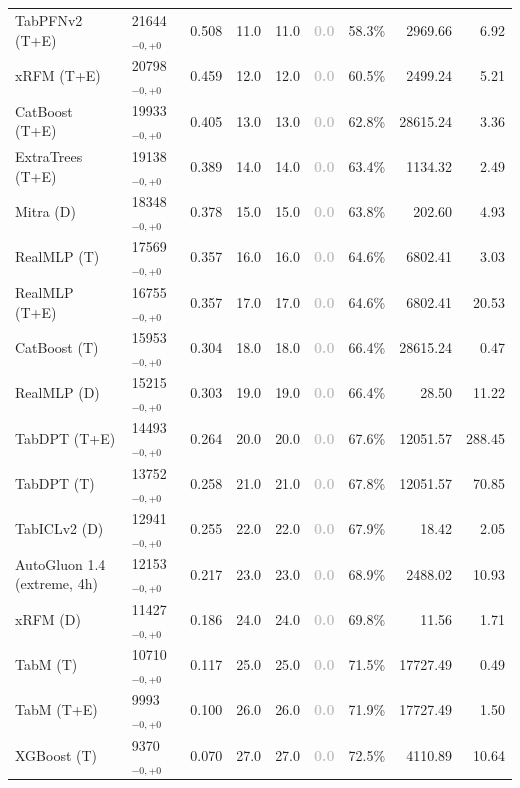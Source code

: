 \begin{tabular}{llcccccrr}
TabPFNv2 (T+E) & 21644${}_{-0,+0}$ & 0.508 & 11.0 & 11.0 & \textcolor{silver}{\textbf{0.0}} & 58.3\% & 2969.66 & 6.92 \\
xRFM (T+E) & 20798${}_{-0,+0}$ & 0.459 & 12.0 & 12.0 & \textcolor{silver}{\textbf{0.0}} & 60.5\% & 2499.24 & 5.21 \\
CatBoost (T+E) & 19933${}_{-0,+0}$ & 0.405 & 13.0 & 13.0 & \textcolor{silver}{\textbf{0.0}} & 62.8\% & 28615.24 & 3.36 \\
ExtraTrees (T+E) & 19138${}_{-0,+0}$ & 0.389 & 14.0 & 14.0 & \textcolor{silver}{\textbf{0.0}} & 63.4\% & 1134.32 & 2.49 \\
Mitra (D) & 18348${}_{-0,+0}$ & 0.378 & 15.0 & 15.0 & \textcolor{silver}{\textbf{0.0}} & 63.8\% & 202.60 & 4.93 \\
RealMLP (T) & 17569${}_{-0,+0}$ & 0.357 & 16.0 & 16.0 & \textcolor{silver}{\textbf{0.0}} & 64.6\% & 6802.41 & 3.03 \\
RealMLP (T+E) & 16755${}_{-0,+0}$ & 0.357 & 17.0 & 17.0 & \textcolor{silver}{\textbf{0.0}} & 64.6\% & 6802.41 & 20.53 \\
CatBoost (T) & 15953${}_{-0,+0}$ & 0.304 & 18.0 & 18.0 & \textcolor{silver}{\textbf{0.0}} & 66.4\% & 28615.24 & 0.47 \\
RealMLP (D) & 15215${}_{-0,+0}$ & 0.303 & 19.0 & 19.0 & \textcolor{silver}{\textbf{0.0}} & 66.4\% & 28.50 & 11.22 \\
TabDPT (T+E) & 14493${}_{-0,+0}$ & 0.264 & 20.0 & 20.0 & \textcolor{silver}{\textbf{0.0}} & 67.6\% & 12051.57 & 288.45 \\
TabDPT (T) & 13752${}_{-0,+0}$ & 0.258 & 21.0 & 21.0 & \textcolor{silver}{\textbf{0.0}} & 67.8\% & 12051.57 & 70.85 \\
TabICLv2 (D) & 12941${}_{-0,+0}$ & 0.255 & 22.0 & 22.0 & \textcolor{silver}{\textbf{0.0}} & 67.9\% & 18.42 & 2.05 \\
AutoGluon 1.4 (extreme, 4h) & 12153${}_{-0,+0}$ & 0.217 & 23.0 & 23.0 & \textcolor{silver}{\textbf{0.0}} & 68.9\% & 2488.02 & 10.93 \\
xRFM (D) & 11427${}_{-0,+0}$ & 0.186 & 24.0 & 24.0 & \textcolor{silver}{\textbf{0.0}} & 69.8\% & 11.56 & 1.71 \\
TabM (T) & 10710${}_{-0,+0}$ & 0.117 & 25.0 & 25.0 & \textcolor{silver}{\textbf{0.0}} & 71.5\% & 17727.49 & 0.49 \\
TabM (T+E) & 9993${}_{-0,+0}$ & 0.100 & 26.0 & 26.0 & \textcolor{silver}{\textbf{0.0}} & 71.9\% & 17727.49 & 1.50 \\
XGBoost (T) & 9370${}_{-0,+0}$ & 0.070 & 27.0 & 27.0 & \textcolor{silver}{\textbf{0.0}} & 72.5\% & 4110.89 & 10.64 \\

\end{tabular}
